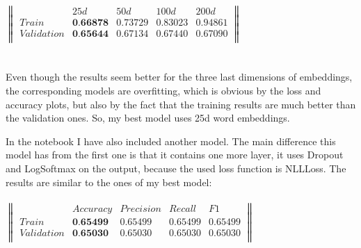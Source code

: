 \documentclass{article}
\begin{document}
$
\begin{Vmatrix}
& 25d & 50d & 100d & 200d\\
Train & \textbf{0.66878} & 0.73729 & 0.83023 & 0.94861\\
Validation & \textbf{0.65644} & 0.67134 & 0.67440 & 0.67090\\
\end{Vmatrix} 
$ \\ \\ \\
Even though the results seem better for the three last dimensions of embeddings, the corresponding models are overfitting, which is obvious by the loss and accuracy plots, but also by the fact that the training results are much better than the validation ones. So, my best model uses 25d word embeddings. 

In the notebook I have also included another model. The main difference this model has from the first one is that it contains one more layer, it uses Dropout and LogSoftmax on the output, because the used loss function is NLLLoss. The results are similar to the ones of my best model: \\ \\
$
\begin{Vmatrix}
& Accuracy & Precision &  Recall & F1\\
Train & \textbf{0.65499} & 0.65499 & 0.65499 & 0.65499\\
Validation & \textbf{0.65030} & 0.65030 & 0.65030 & 0.65030\\
\end{Vmatrix} 
$ \\ \\ \\
\end{document}
